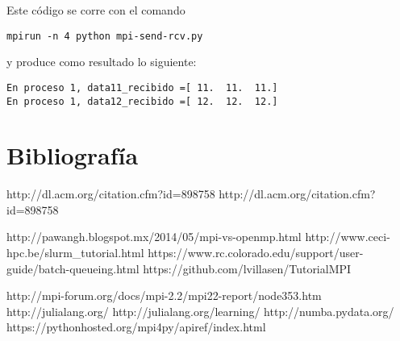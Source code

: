 \documentclass[letter]{jpconf}
\begin{document}
Este c\'odigo se corre con el comando
\color{blue}
\begin{verbatim}
mpirun -n 4 python mpi-send-rcv.py
\end{verbatim}
\color{black}
y produce como resultado lo siguiente:
\color{brown}
\begin{verbatim}
En proceso 1, data11_recibido =[ 11.  11.  11.]
En proceso 1, data12_recibido =[ 12.  12.  12.]
\end{verbatim}
\color{black}



\section*{Bibliograf\'ia}
\begin{thebibliography}{9}
http://dl.acm.org/citation.cfm?id=898758
http://dl.acm.org/citation.cfm?id=898758

 http://pawangh.blogspot.mx/2014/05/mpi-vs-openmp.html
 http://www.ceci-hpc.be/slurm\_tutorial.html
 https://www.rc.colorado.edu/support/user-guide/batch-queueing.html
 https://github.com/lvillasen/TutorialMPI

http://mpi-forum.org/docs/mpi-2.2/mpi22-report/node353.htm
 http://julialang.org/
 http://julialang.org/learning/
 http://numba.pydata.org/
 https://pythonhosted.org/mpi4py/apiref/index.html

\end{thebibliography}
\end{document}
